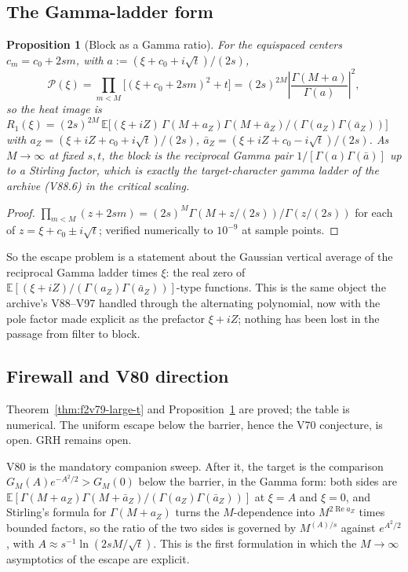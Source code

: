 \documentclass[11pt]{article}
\newtheorem{proposition}[theorem]{Proposition}
\theoremstyle{definition}
\theoremstyle{remark}
\begin{document}
\subsection{The Gamma-ladder form}

\begin{proposition}[Block as a Gamma ratio]
\label{prop:f2v79-gamma}
For the equispaced centers \(c_m=c_0+2sm\), with
\(a:=(\xi+c_0+i\sqrt t)/(2s)\),
\begin{equation}
 \mathcal P(\xi)=\prod_{m<M}\bigl[(\xi+c_0+2sm)^2+t\bigr]
 =(2s)^{2M}\left|\frac{\Gamma(M+a)}{\Gamma(a)}\right|^2 ,
 \label{eq:f2v79-gamma}
\end{equation}
so the heat image is
\(R_1(\xi)=(2s)^{2M}\,\mathbb E\bigl[(\xi+iZ)\,\Gamma(M+a_Z)\Gamma(M+\bar a_Z)/(\Gamma(a_Z)\Gamma(\bar a_Z))\bigr]\)
with \(a_Z=(\xi+iZ+c_0+i\sqrt t)/(2s)\), \(\bar a_Z=(\xi+iZ+c_0-i\sqrt t)/(2s)\).
As \(M\to\infty\) at fixed \(s,t\), the block is the reciprocal Gamma
pair \(1/[\Gamma(a)\Gamma(\bar a)]\) up to a Stirling factor, which is
exactly the target-character gamma ladder of the archive (V88.6) in the
critical scaling.
\end{proposition}

\begin{proof}
\(\prod_{m<M}(z+2sm)=(2s)^M\Gamma(M+z/(2s))/\Gamma(z/(2s))\) for each of
\(z=\xi+c_0\pm i\sqrt t\); verified numerically to \(10^{-9}\) at sample
points.
\end{proof}

So the escape problem is a statement about the Gaussian vertical average
of the reciprocal Gamma ladder times \(\xi\): the real zero of
\(\mathbb E[(\xi+iZ)/(\Gamma(a_Z)\Gamma(\bar a_Z))]\)-type functions.
This is the same object the archive's V88--V97 handled through the
alternating polynomial, now with the pole factor made explicit as the
prefactor \(\xi+iZ\); nothing has been lost in the passage from filter
to block.

\subsection*{Firewall and V80 direction}
\label{fire:f2v79}
Theorem~\ref{thm:f2v79-large-t} and Proposition~\ref{prop:f2v79-gamma}
are proved; the table is numerical.  The uniform escape below the
barrier, hence the V70 conjecture, is open.  GRH remains open.

V80 is the mandatory companion sweep.  After it, the target is the
comparison \(G_M(A)e^{-A^2/2}>G_M(0)\) below the barrier, in the Gamma
form: both sides are \(\mathbb E[\Gamma(M+a_Z)\Gamma(M+\bar a_Z)/(\Gamma(a_Z)\Gamma(\bar a_Z))]\)
at \(\xi=A\) and \(\xi=0\), and Stirling's formula for \(\Gamma(M+a_Z)\)
turns the \(M\)-dependence into \(M^{2\operatorname{Re}a_Z}\) times
bounded factors, so the ratio of the two sides is governed by
\(M^{(A)/s}\) against \(e^{A^2/2}\), with \(A\approx s^{-1}\ln(2sM/\sqrt t)\).
This is the first formulation in which the \(M\to\infty\) asymptotics
of the escape are explicit.
\end{document}
